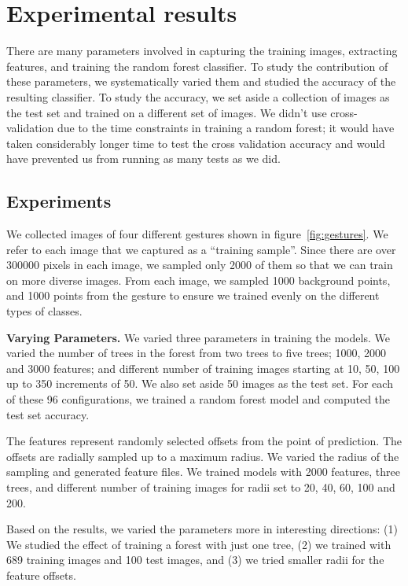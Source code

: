 \section{Experimental results}
There are many parameters involved in capturing the training images, extracting features, and training the random forest classifier. To study the contribution of these parameters, we systematically varied them and studied the accuracy of the resulting classifier. To study the accuracy, we set aside a collection of images as the test set and trained on a different set of images. We didn't use cross-validation due to the time constraints in training a random forest; it would have taken considerably longer time to test the cross validation accuracy and would  have prevented us from running as many tests as we did.

\subsection{Experiments}
We collected images of four different gestures shown in figure~\ref{fig:gestures}. We refer to each image that we captured as a ``training sample''. Since there are over 300000 pixels in each image, we sampled only 2000 of them so that we can train on more diverse images. From each image, we sampled 1000 background points, and 1000 points from the gesture to ensure we trained evenly on the different types of classes.

\textbf{Varying Parameters.} We varied three parameters in training the models. We varied the number of trees in the forest from two trees to five trees; 1000, 2000 and 3000 features; and different number of training images starting at 10, 50, 100 up to 350 increments of 50. We also set aside 50 images as the test set. For each of these 96 configurations, we trained a random forest model and computed the test set accuracy.

The features represent randomly selected offsets from the point of prediction. The offsets are radially sampled up to a maximum radius. We varied the radius of the sampling and generated feature files. We trained models with 2000 features, three trees, and different number of training images for radii set to 20, 40, 60, 100 and 200. 

Based on the results, we varied the parameters more in interesting directions: (1) We studied the effect of training a forest with just one tree, (2) we trained with 689 training images and 100 test images, and (3) we tried smaller radii for the feature offsets. 


